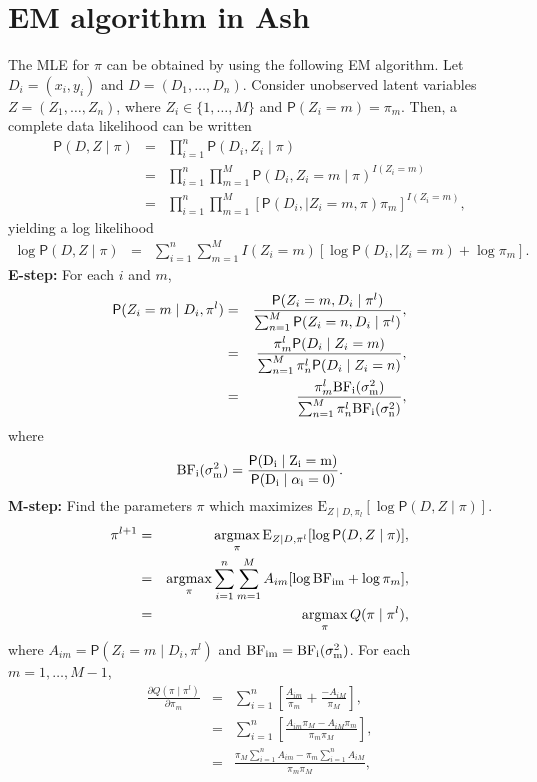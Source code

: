 \documentclass[12pt,letterpaper]{article}
\renewcommand{\Pr}{\mathsf{P}}
\newcommand{\given}{\mid}
\newcommand{\mean}{\mathrm{E}}
\newcommand{\argmax}{\operatornamewithlimits{argmax}}
\def\BF{\rm BF}
\begin{document}
\section{EM algorithm in Ash}
\label{sec:EM_Ash}
The MLE for $\pi$ can be obtained by using the following EM algorithm. Let $D_i = (x_i, y_i)$ and $D = (D_1, \ldots, D_n)$. Consider unobserved latent variables $Z = (Z_1, \ldots, Z_n)$, where $Z_i \in \{1, \ldots, M\}$ and $\Pr(Z_i = m) = \pi_m$. Then, a complete data likelihood can be written 
\begin{eqnarray}
\Pr(D, Z \given \pi) &=& \prod_{i=1}^{n}\Pr(D_i, Z_i \given \pi)\\
&=& \prod_{i=1}^{n} \prod_{m=1}^M\Pr(D_i, Z_i = m \given \pi)^{I(Z_i = m)}\\
&=& \prod_{i=1}^{n} \prod_{m=1}^M[\Pr(D_i, \given Z_i = m, \pi)\pi_m] ^{I(Z_i = m)},
\end{eqnarray}
yielding a log likelihood
\begin{eqnarray}
\log\Pr(D, Z \given \pi) &=& \sum_{i=1}^{n} \sum_{m=1}^M I(Z_i = m)[\log{\Pr(D_i, \given Z_i = m)} + \log{\pi_m}].
\end{eqnarray}
{\bf E-step:} For each $i$ and $m$,
\begin{eqnarray}
\Pr(Z_i = m \given D_i, \pi^l) &=& \frac{\Pr(Z_i = m, D_i \given \pi^l)}{\sum_{n=1}^M\Pr(Z_i = n, D_i \given \pi^l)},\\
&=& \frac{\pi_m^l\Pr(D_i \given Z_i = m)}{\sum_{n=1}^M\pi_n^l\Pr(D_i \given Z_i = n)},\\
&=& \frac{\pi_m^l\BF_i(\sigma^2_m)}{\sum_{n=1}^M\pi_n^l\BF_i(\sigma^2_n)},
\end{eqnarray}
where
\begin{eqnarray}
\BF_i(\sigma^2_m) =  \frac{\Pr(D_i \given Z_i = m)}{\Pr(D_i \given \alpha_i = 0)}.
\end{eqnarray}
{\bf M-step:} Find the parameters $\pi$ which maximizes $\mean_{Z \given D, \pi_l}[\log\Pr(D, Z \given \pi)]$.
\begin{eqnarray}
\pi^{l+1} &=& \argmax_{\pi}\mean_{Z \given D, \pi^l}[\log\Pr(D, Z \given \pi)],\\
	       &=& \argmax_{\pi} \sum_{i=1}^{n} \sum_{m=1}^M A_{im}[\log{\BF_{im}} + \log{\pi_m}],\\
	       &=& \argmax_{\pi} Q(\pi \given \pi^l),
\end{eqnarray}
where $A_{im} = \Pr(Z_i = m \given D_i, \pi^l)$ and $\BF_{im} = \BF_i(\sigma^2_m)$. 
For each $m = 1, \ldots, M-1$,
\begin{eqnarray}
\frac{\partial Q(\pi \given \pi^l)}{\partial \pi_m} &=& \sum_{i=1}^n[\frac{A_{im}}{\pi_m} + \frac{-A_{iM}}{\pi_M}],\\
			&=& \sum_{i=1}^n[\frac{A_{im}\pi_M -A_{iM}\pi_m}{\pi_m\pi_M}],\\
			&=& \frac{\pi_M \sum_{i=1}^nA_{im} -\pi_m \sum_{i=1}^nA_{iM}}{\pi_m\pi_M},
\end{eqnarray}
\end{document}
